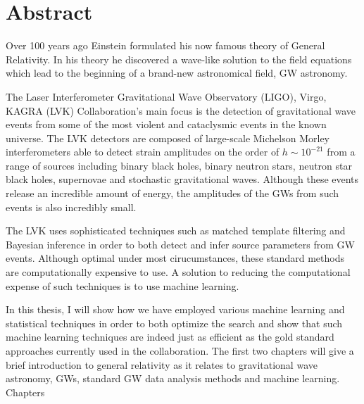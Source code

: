 \chapter{Abstract}

Over 100 years ago Einstein formulated his now famous theory of 
General Relativity. In his theory he discovered a wave-like solution 
to the field equations which lead to the beginning of a brand-new 
astronomical field, \ac{GW} astronomy. 

The Laser Interferometer Gravitational Wave Observatory (LIGO), Virgo, 
KAGRA (LVK) Collaboration's main focus is the detection of gravitational 
wave events from some of the most violent and cataclysmic events 
in the known universe. The LVK detectors are composed of 
large-scale Michelson Morley interferometers able to detect 
strain amplitudes on the order of $h \sim 10^{-21}$ from a range 
of sources including binary black holes, binary neutron stars, 
neutron star black holes, supernovae and stochastic gravitational 
waves. Although these events release an incredible amount of 
energy, the amplitudes of the \ac{GW}s from such events 
is also incredibly small. 

The LVK uses sophisticated techniques such as matched 
template filtering and Bayesian inference in order 
to both detect and infer source parameters 
from \ac{GW} events. Although optimal under most 
cirucumstances, these standard methods are computationally 
expensive to use. A solution to reducing the computational 
expense of such techniques is to use machine learning.

In this thesis, I will show how we have employed 
various machine learning and statistical techniques 
in order to both optimize the search and show 
that such machine learning techniques are indeed just 
as efficient as the gold standard approaches currently 
used in the collaboration. The first two chapters 
will give a brief introduction to general relativity 
as it relates to gravitational wave astronomy, \ac{GW}s, 
standard \ac{GW} data analysis methods and machine 
learning. Chapters 

